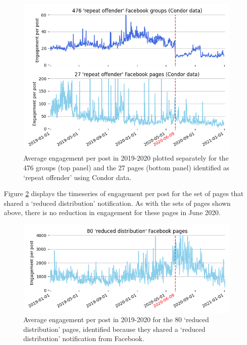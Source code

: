 \documentclass[review]{elsarticle}
\begin{document}
{{\begin{figure}[!h]
\centering
\includegraphics[scale=0.5]{./../figure/supplementary_engagement_groups_and_pages_condor.png}
\caption{
Average engagement per post in 2019-2020 plotted separately for the 476 groups (top panel) and the 27 pages (bottom panel) identified as `repeat offender' using Condor data.
}
\label{engagement_groups_and_pages_condor}
\end{figure}

Figure \ref{engagement_groups_and_pages_reduce} displays the timeseries of engagement per post for the set of pages that shared a `reduced distribution' notification.
As with the sets of pages shown above, there is no reduction in engagement for these pages in June 2020.

\begin{figure}[!h]
\centering
\includegraphics[scale=0.5]{./../figure/supplementary_engagement_pages_reduce.png}
\caption{
Average engagement per post in 2019-2020 for the 80 `reduced distribution' pages, identified because they shared a `reduced distribution' notification from Facebook.
}
\label{engagement_groups_and_pages_reduce}
\end{figure}

}}
\end{document}

